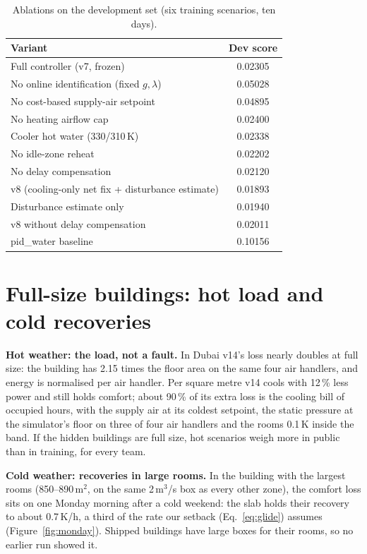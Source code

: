 \documentclass{article}
\begin{document}
\begin{table}[h]\centering
\caption{Ablations on the development set (six training scenarios, ten days).}\label{tab:abl}
\small
\begin{tabular}{lc}\toprule
Variant & Dev score\\\midrule
Full controller (v7, frozen) & 0.02305\\
No online identification (fixed $g,\lambda$) & 0.05028\\
No cost-based supply-air setpoint & 0.04895\\
No heating airflow cap & 0.02400\\
Cooler hot water (330/310\,K) & 0.02338\\
No idle-zone reheat & 0.02202\\
No delay compensation & 0.02120\\\midrule
v8 (cooling-only net fix + disturbance estimate) & 0.01893\\
Disturbance estimate only & 0.01940\\
v8 without delay compensation & 0.02011\\\midrule
pid\_water baseline & 0.10156\\\bottomrule
\end{tabular}
\end{table}

\section{Full-size buildings: hot load and cold recoveries}\label{app:monday}
\textbf{Hot weather: the load, not a fault.} In Dubai v14's loss nearly doubles at full size: the building has 2.15
times the floor area on the same four air handlers, and energy is normalised per air handler. Per square metre v14
cools with 12\,\% less power and still holds comfort; about 90\,\% of its extra loss is the cooling bill of occupied
hours, with the supply air at its coldest setpoint, the static pressure at the simulator's floor on three of four air
handlers and the rooms 0.1\,K inside the band. If the hidden buildings are full size, hot scenarios weigh more in
public than in training, for every team.

\textbf{Cold weather: recoveries in large rooms.} In the building with the largest rooms (850--890\,m$^2$, on the same
2\,m$^3$/s box as every other zone), the comfort loss sits on one Monday morning after a cold weekend: the slab holds
their recovery to about 0.7\,K/h, a third of the rate our setback (Eq.~\ref{eq:glide}) assumes
(Figure~\ref{fig:monday}). Shipped buildings have large boxes for their rooms, so no earlier run showed it.
\end{document}
